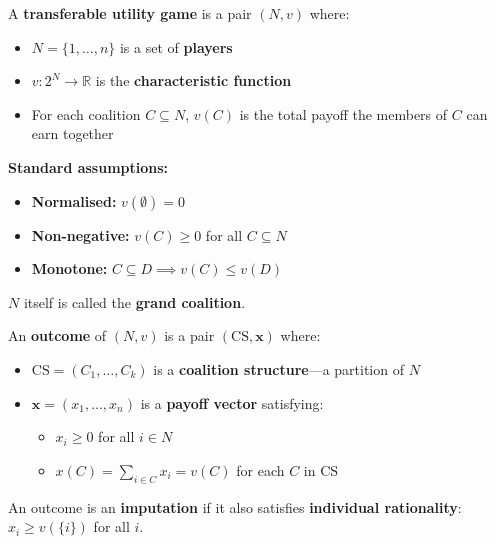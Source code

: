 \begin{defbox}[TU Game]
A \textbf{transferable utility game} is a pair $(N, v)$ where:
\begin{itemize}
  \item $N = \{1, \ldots, n\}$ is a set of \textbf{players}
  \item $v: 2^N \to \mathbb{R}$ is the \textbf{characteristic function}
  \item For each coalition $C \subseteq N$, $v(C)$ is the total payoff the members of $C$ can earn together
\end{itemize}

\textbf{Standard assumptions:}
\begin{itemize}
  \item \textbf{Normalised:} $v(\emptyset) = 0$
  \item \textbf{Non-negative:} $v(C) \geq 0$ for all $C \subseteq N$
  \item \textbf{Monotone:} $C \subseteq D \implies v(C) \leq v(D)$
\end{itemize}

$N$ itself is called the \textbf{grand coalition}.
\end{defbox}

\begin{defbox}
An \textbf{outcome} of $(N, v)$ is a pair $(\text{CS}, \mathbf{x})$ where:
\begin{itemize}
  \item $\text{CS} = (C_1, \ldots, C_k)$ is a \textbf{coalition structure}---a partition of $N$
  \item $\mathbf{x} = (x_1, \ldots, x_n)$ is a \textbf{payoff vector} satisfying:
  \begin{itemize}
    \item $x_i \geq 0$ for all $i \in N$
    \item $x(C) = \sum_{i \in C} x_i = v(C)$ for each $C$ in CS
  \end{itemize}
\end{itemize}

An outcome is an \textbf{imputation} if it also satisfies \textbf{individual rationality}: $x_i \geq v(\{i\})$ for all $i$.
\end{defbox}

